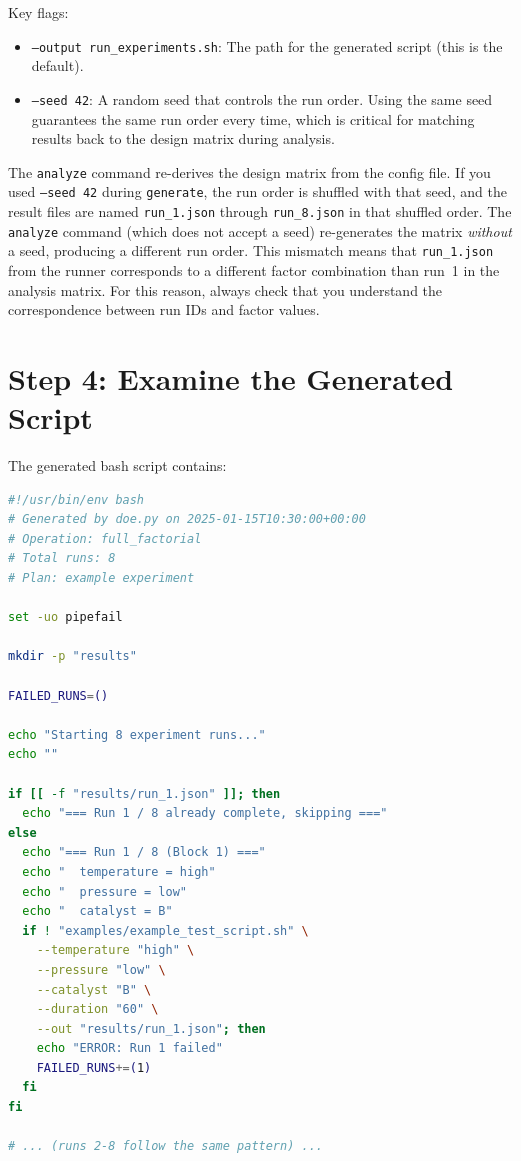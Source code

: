 \documentclass[11pt]{book}
\begin{document}
Key flags:
\begin{itemize}
  \item \texttt{--output run\_experiments.sh}: The path for the generated script (this is the default).
  \item \texttt{--seed 42}: A random seed that controls the run order. Using the same seed guarantees the same run order every time, which is critical for matching results back to the design matrix during analysis.
\end{itemize}

\begin{warning}
The \texttt{analyze} command re-derives the design matrix from the config file. If you used \texttt{--seed 42} during \texttt{generate}, the run order is shuffled with that seed, and the result files are named \texttt{run\_1.json} through \texttt{run\_8.json} in that shuffled order. The \texttt{analyze} command (which does not accept a seed) re-generates the matrix \emph{without} a seed, producing a different run order. This mismatch means that \texttt{run\_1.json} from the runner corresponds to a different factor combination than run~1 in the analysis matrix. For this reason, always check that you understand the correspondence between run IDs and factor values.
\end{warning}

\section{Step 4: Examine the Generated Script}

The generated bash script contains:

\begin{lstlisting}[language=bash]
#!/usr/bin/env bash
# Generated by doe.py on 2025-01-15T10:30:00+00:00
# Operation: full_factorial
# Total runs: 8
# Plan: example experiment

set -uo pipefail

mkdir -p "results"

FAILED_RUNS=()

echo "Starting 8 experiment runs..."
echo ""

if [[ -f "results/run_1.json" ]]; then
  echo "=== Run 1 / 8 already complete, skipping ==="
else
  echo "=== Run 1 / 8 (Block 1) ==="
  echo "  temperature = high"
  echo "  pressure = low"
  echo "  catalyst = B"
  if ! "examples/example_test_script.sh" \
    --temperature "high" \
    --pressure "low" \
    --catalyst "B" \
    --duration "60" \
    --out "results/run_1.json"; then
    echo "ERROR: Run 1 failed"
    FAILED_RUNS+=(1)
  fi
fi

# ... (runs 2-8 follow the same pattern) ...
\end{lstlisting}
\end{document}
